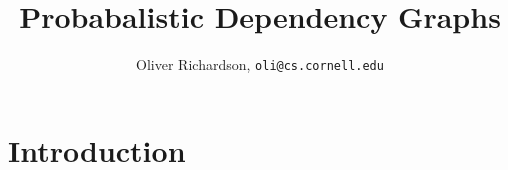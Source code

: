 \documentclass{article}
\title{Probabalistic Dependency Graphs}
\author{Oliver Richardson,  \texttt{oli@cs.cornell.edu}}
\begin{document}
	\maketitle
	
	\section{Introduction}
	
	
	
\end{document}
